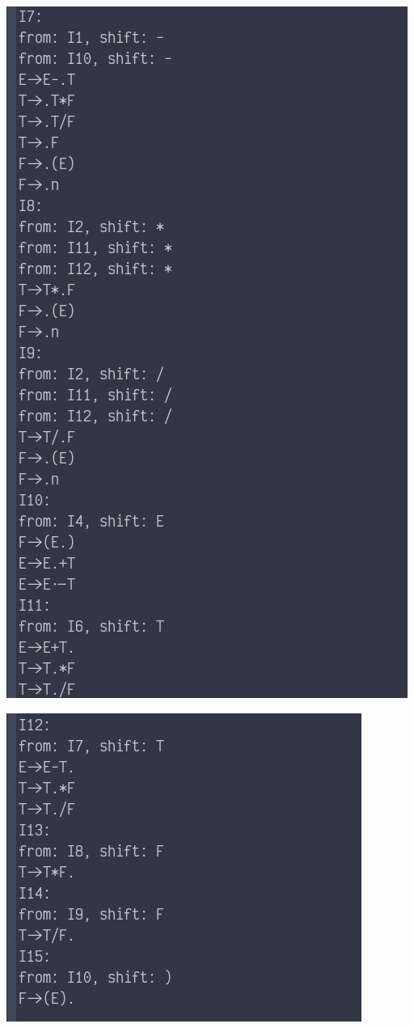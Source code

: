 \documentclass[fontset=none,UTF8,a4paper,zihao=-4]{ctexart}
\begin{document}
\begin{itemize}
\begin{center}
\includegraphics[width=.9\linewidth]{运行截图/2020-11-26_00-46-53_screenshot.png}
\end{center}

\begin{center}
\includegraphics[width=.9\linewidth]{运行截图/2020-11-26_00-47-20_screenshot.png}
\end{center}


\end{itemize}
\end{document}
